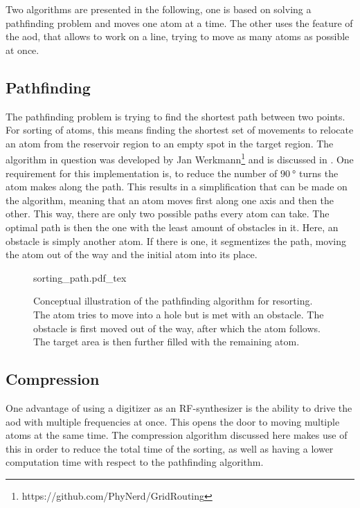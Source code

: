Two algorithms are presented in the following, one is based on solving a pathfinding problem and moves one atom at a time. The other uses the feature of the \ac{aod}, that allows to work on a line, trying to move as many atoms as possible at once.


\subsection{Pathfinding}

The pathfinding problem is trying to find the shortest path between two points. For sorting of atoms, this means finding the shortest set of movements to relocate an atom from the reservoir region to an empty spot in the target region.
The algorithm in question was developed by Jan Werkmann\footnote{https://github.com/PhyNerd/GridRouting}  and is discussed in \cite{OhldeMello2020}. One requirement for this implementation is, to reduce the number of $\SI{90}{\degree}$ turns the atom makes along the path. This results in a simplification that can be made on the algorithm, meaning that an atom moves first along one axis and then the other. This way, there are only two possible paths every atom can take. The optimal path is then the one with the least amount of obstacles in it. Here, an obstacle is simply another atom. If there is one, it segmentizes the path, moving the atom out of the way and the initial atom into its place.

\begin{figure}[ht]
\label{fig:sorting_path}
\centering
	{sorting_path.pdf_tex}
	\caption{Conceptual illustration of the pathfinding algorithm for resorting. The atom tries to move into a hole but is met with an obstacle. The obstacle is first moved out of the way, after which the atom follows. The target area is then further filled with the remaining atom.}
\end{figure}

\subsection{Compression}
\label{sec:compression}

One advantage of using a digitizer as an RF-synthesizer is the ability to drive the \ac{aod} with multiple frequencies at once. This opens the door to moving multiple atoms at the same time. The compression algorithm discussed here makes use of this in order to reduce the total time of the sorting, as well as having a lower computation time with respect to the pathfinding algorithm.

